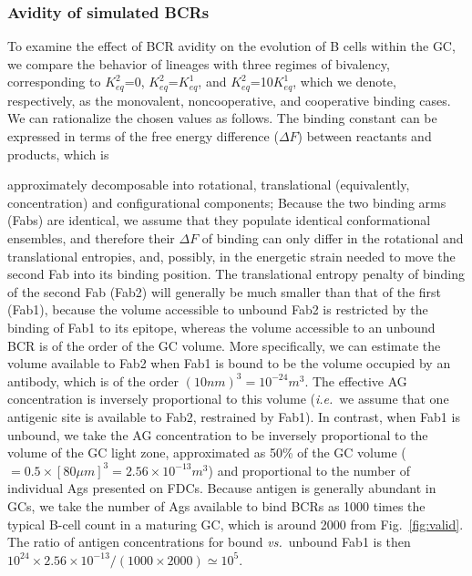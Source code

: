 \documentclass[utf8]{frontiersHLTH}%
\newcommand{\vo}[1]{#1} %
\def\ie {{\it i.e.}}
\def\vs {{\it vs.}}
\newcommand{\fig}[1]{Fig.~\ref{fig:#1}}
\newcommand{\hide}[1]{}
\begin{document}
\subsubsection{Avidity of simulated BCRs}
\label{sec:avidity}
To examine the effect of BCR avidity on the evolution of B cells within the GC,
we compare the behavior of lineages with three regimes of bivalency, corresponding to $K^2_{eq}$=0,
$K^2_{eq}$=$K^1_{eq}$, and $K^2_{eq}$=10$K^1_{eq}$, which we denote,
respectively, as the monovalent, noncooperative, and cooperative binding
cases. We can rationalize the chosen values as
follows. The binding constant can be expressed in terms of the free
energy difference ($\Delta F$) 
between reactants and products, which is
\hide{decomposable into energetic and entropic contributions.
\cite{Hill86} Of
special interest to us is the binding entropy,
which is }
approximately decomposable into rotational, translational
(equivalently, concentration) and configurational components\cite{Hill86};
Because the two binding arms (Fabs)
are identical, we assume that they populate identical conformational ensembles,
and therefore their $\Delta F$ of binding can only
differ in the rotational and translational entropies, and, possibly, in the
energetic strain needed to move the second Fab into its binding position.
The translational entropy penalty of binding of the second Fab (Fab2)
will generally be much smaller than that of the first (Fab1), because the volume
accessible to unbound Fab2 is restricted by the binding of Fab1 to its
epitope, whereas the volume accessible to an unbound BCR is of the order of the GC volume.
\vo{More specifically, we can estimate the volume available to Fab2
when Fab1 is bound to be the volume occupied by an antibody, which is of the order $(10nm)^3=10^{-24}m^3$.
The effective AG concentration is inversely proportional to this volume (\ie~we assume that one antigenic site is available to Fab2,
restrained by Fab1). In contrast, when Fab1 is unbound, we take the AG concentration to be inversely proportional to the volume of the
GC light zone, approximated as 50\% of the GC volume ($=0.5 \times [80\mu m]^3=2.56\times10^{-13}m^3 $) and proportional to
the number of individual Ags presented on FDCs. Because antigen is generally abundant in GCs,\cite{el-shikh10} we take the number of
Ags available to bind BCRs as 1000 times the typical B-cell count in a maturing GC, which is around 2000 from \fig{valid}.
The ratio of antigen concentrations for bound \vs~unbound Fab1 is then
$10^{24} \times 2.56 \times 10^{-13} / (1000 \times 2000)\simeq 10^5$.}
\end{document}
